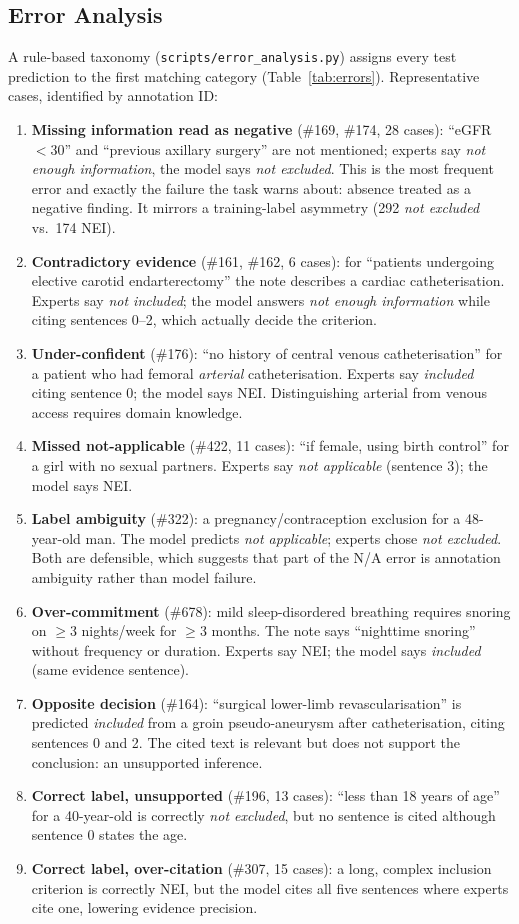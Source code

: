 \documentclass[conference]{IEEEtran}
\newcommand{\code}[1]{\texttt{\small #1}}
\begin{document}
\subsection{Error Analysis}
A rule-based taxonomy (\code{scripts/error\_analysis.py}) assigns every test prediction to the first matching category (Table~\ref{tab:errors}). Representative cases, identified by annotation ID:
\begin{enumerate}
\item \textbf{Missing information read as negative} (\#169, \#174, 28 cases): ``eGFR $<$30'' and ``previous axillary surgery'' are not mentioned; experts say \emph{not enough information}, the model says \emph{not excluded}. This is the most frequent error and exactly the failure the task warns about: absence treated as a negative finding. It mirrors a training-label asymmetry (292 \emph{not excluded} vs.\ 174 NEI).
\item \textbf{Contradictory evidence} (\#161, \#162, 6 cases): for ``patients undergoing elective carotid endarterectomy'' the note describes a cardiac catheterisation. Experts say \emph{not included}; the model answers \emph{not enough information} while citing sentences 0--2, which actually decide the criterion.
\item \textbf{Under-confident} (\#176): ``no history of central venous catheterisation'' for a patient who had femoral \emph{arterial} catheterisation. Experts say \emph{included} citing sentence 0; the model says NEI. Distinguishing arterial from venous access requires domain knowledge.
\item \textbf{Missed not-applicable} (\#422, 11 cases): ``if female, using birth control'' for a girl with no sexual partners. Experts say \emph{not applicable} (sentence 3); the model says NEI.
\item \textbf{Label ambiguity} (\#322): a pregnancy/contraception exclusion for a 48-year-old man. The model predicts \emph{not applicable}; experts chose \emph{not excluded}. Both are defensible, which suggests that part of the N/A error is annotation ambiguity rather than model failure.
\item \textbf{Over-commitment} (\#678): mild sleep-disordered breathing requires snoring on $\ge$3 nights/week for $\ge$3 months. The note says ``nighttime snoring'' without frequency or duration. Experts say NEI; the model says \emph{included} (same evidence sentence).
\item \textbf{Opposite decision} (\#164): ``surgical lower-limb revascularisation'' is predicted \emph{included} from a groin pseudo-aneurysm after catheterisation, citing sentences 0 and 2. The cited text is relevant but does not support the conclusion: an unsupported inference.
\item \textbf{Correct label, unsupported} (\#196, 13 cases): ``less than 18 years of age'' for a 40-year-old is correctly \emph{not excluded}, but no sentence is cited although sentence 0 states the age.
\item \textbf{Correct label, over-citation} (\#307, 15 cases): a long, complex inclusion criterion is correctly NEI, but the model cites all five sentences where experts cite one, lowering evidence precision.
\end{enumerate}
\end{document}
